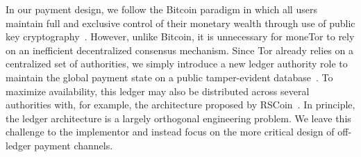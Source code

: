 In our payment design, we follow the Bitcoin paradigm in which all users
maintain full and exclusive control of their monetary wealth through use of
public key cryptography~\cite{nakamoto2008bitcoin}. However, unlike Bitcoin, it
is unnecessary for moneTor to rely on an inefficient decentralized consensus
mechanism. Since Tor already relies on a centralized set of authorities, we
simply introduce a new ledger authority role to maintain the global payment
state on a public tamper-evident database~\cite{crosby2009efficient}. To
maximize availability, this ledger may also be distributed across several
authorities with, for example, the architecture proposed by
RSCoin~\cite{danezis2015centrally}. In principle, the ledger architecture is a
largely orthogonal engineering problem. We leave this challenge to the
implementor and instead focus on the more critical design of off-ledger payment
channels.




